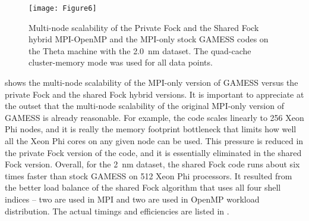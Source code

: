 \begin{figure}
	\texttt{[image: Figure6]}
	\caption{Multi-node scalability of the Private Fock and the Shared Fock hybrid MPI-OpenMP
    		 and the MPI-only stock GAMESS codes on the Theta machine with the 2.0~nm dataset.
             The quad-cache cluster-memory mode was used for all data points.}
    \label{fig:2nm}
\end{figure}

 shows the multi-node scalability of the MPI-only version of GAMESS versus the private Fock and the shared Fock hybrid versions. It is important to appreciate at the outset that the multi-node scalability of the original MPI-only version of GAMESS is already reasonable. For example, the code scales linearly to 256 Xeon Phi nodes, and it is really the memory footprint bottleneck that limits how well all the Xeon Phi cores on any given node can be used. This pressure is reduced in the private Fock version of the code, and it is essentially eliminated in the shared Fock version. Overall, for the 2~nm dataset, the shared Fock code runs about six times faster than stock GAMESS on 512 Xeon Phi processors. It resulted from the better load balance of the shared Fock algorithm that uses all four shell indices -- two are used in MPI and two are used in OpenMP workload distribution. The actual timings and efficiencies are listed in .

